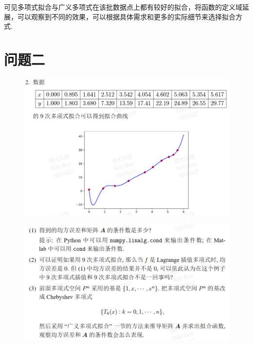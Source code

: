\documentclass[UTF8,ctexart,a4paper,11pt,openany]{article}
\theoremstyle{definition}
\begin{document}
        可见多项式拟合与广义多项式在该批数据点上都有较好的拟合，将函数的定义域延展，可以观察到不同的效果，可以根据具体需求和更多的实际细节来选择拟合方式. 
\section{问题二} 
    \begin{figure}[H]
        \centering
        \includegraphics[width=\linewidth]{pics/7pro2.1.png}
        \end{figure}
    \begin{figure}[H]
        \centering
        \includegraphics[width=\linewidth]{pics/7pro2.2.png}
        \end{figure}
\end{document}
